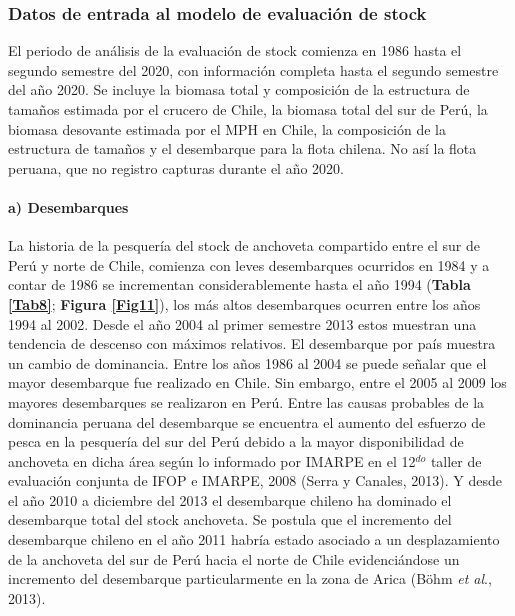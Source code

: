 \documentclass[letter,11pt]{article}
\begin{document}
\subsubsection{Datos de entrada al modelo de evaluaci\'on de stock}

El periodo de an\'alisis de la evaluaci\'on de stock comienza en 1986 hasta
el segundo semestre del 2020, con informaci\'on completa hasta el segundo
semestre del a\~{n}o 2020. Se incluye la biomasa total y composici\'on de la
estructura de tama\~{n}os estimada por el crucero de Chile, la biomasa total
del sur de Per\'u, la biomasa desovante estimada por el MPH en Chile, la
composici\'on de la estructura de tama\~{n}os y el desembarque para la flota
chilena. No as\'i la flota peruana, que no registro capturas durante el
a\~{n}o 2020.


\paragraph{a) Desembarques}

\quad

La historia de la pesquer\'ia del stock de anchoveta compartido entre el
sur de Per\'u y norte de Chile, comienza con leves desembarques ocurridos
en 1984 y a contar de 1986 se incrementan considerablemente hasta el a\~{n}o
1994 (\textbf{Tabla \ref{Tab8}}; \textbf{Figura \ref{Fig11}}), los m\'as
altos desembarques ocurren entre los a\~{n}os 1994 al 2002. Desde el a\~{n}o
2004 al primer semestre 2013 estos muestran una tendencia de descenso
con m\'aximos relativos. El desembarque por pa\'is muestra un cambio de
dominancia. Entre los a\~{n}os 1986 al 2004 se puede se\~{n}alar que el mayor
desembarque fue realizado en Chile. Sin embargo, entre el 2005 al 2009
los mayores desembarques se realizaron en Per\'u. Entre las causas
probables de la dominancia peruana del desembarque se encuentra el
aumento del esfuerzo de pesca en la pesquer\'ia del sur del Per\'u debido a
la mayor disponibilidad de anchoveta en dicha \'area seg\'un lo informado
por IMARPE en el 12$^{do}$ taller de evaluaci\'on conjunta de IFOP e IMARPE,
2008 (Serra y Canales, 2013). Y desde el a\~{n}o 2010 a diciembre del 2013
el desembarque chileno ha dominado el desembarque total del stock
anchoveta. Se postula que el incremento del desembarque chileno en el
a\~{n}o 2011 habr\'ia estado asociado a un desplazamiento de la anchoveta del
sur de Per\'u hacia el norte de Chile evidenci\'andose un incremento del
desembarque particularmente en la zona de Arica (B\"ohm \textit{et al}.,
2013).
\end{document}
